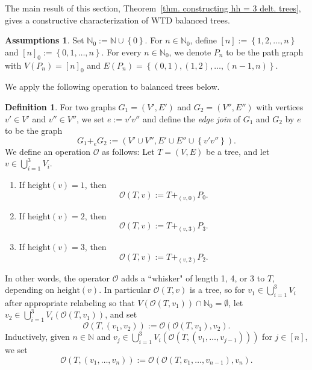 \documentclass[12pt, reqno]{amsart}
\theoremstyle{definition}
\newtheorem*{assumptions}{Assumptions}
\theoremstyle{plain}
\theoremstyle{definition}
\newtheorem{definition}[theorem]{Definition}
\newcommand{\hh}{\mbox{height}}
\newcommand\set[1]{\left\lbrace #1 \right\rbrace}
\begin{document}
The main result of this section, Theorem~\ref{thm. constructing hh = 3 delt. trees}, gives a constructive characterization of WTD balanced trees.

\begin{assumptions}
    Set $\mathbb{N}_0 := \mathbb{N} \cup \set{0}$. 
    For $n \in \mathbb{N}_0$, define $[n] := \set{1,2,\dots,n}$ and $[n]_0 := \set{0,1,\dots,n}$.
    For every $n \in \mathbb{N}_0$, we denote $P_n$ to be the path graph with $V(P_n) = [n]_0$ and $E(P_n) = \set{(0,1),(1,2),\dots,(n-1,n)}$.
\end{assumptions}

We apply the following operation to balanced trees below.

\begin{definition}
    For two graphs $G_1 = (V',E')$ and $G_2 = (V'',E'')$ with vertices $v' \in V'$ and $v'' \in V''$, we set $e:= v'v''$ and define the \emph{edge join} of $G_1$ and $G_2$ by $e$ to be the graph 
    $$
    G_1 +_e G_2 := (V'\cup V'', E' \cup E'' \cup \set{v'v''}).
    $$
    We define an operation $\mathcal{O}$ as follows:
    Let $T = (V,E)$ be a tree, and let $v \in \bigcup_{i = 1}^3V_i$.
    
    \begin{enumerate}
        \item If $\hh(v) = 1$, then 
        $$
        \mathcal{O}(T,v) := T +_{(v,0)} P_0.
        $$  
        \item  If $\hh(v) = 2$, then
        $$
        \mathcal{O}(T,v) := T +_{(v,3)} P_3.
        $$
        \item  If $\hh(v) = 3$, then
        $$
        \mathcal{O}(T,v) := T +_{(v,2)} P_2.
        $$
    \end{enumerate}
    In other words, the operator $\mathcal{O}$ adds a ``whisker" of length 1, 4, or 3 to $T$, depending on $\hh(v)$. 
    In particular $\mathcal{O}(T,v)$ is a tree, so for $v_1 \in \bigcup_{i = 1}^3V_i$ after appropriate relabeling so that $V(\mathcal{O}(T,v_1)) \cap \mathbb{N}_0 = \emptyset$, let $v_2 \in \bigcup_{i = 1}^3V_i(\mathcal{O}(T,v_1))$, and set
    $$
    \mathcal{O}(T,(v_1,v_2)) := \mathcal{O}(\mathcal{O}(T,v_1),v_2).
    $$
    Inductively, given $n \in \mathbb{N}$ and $v_j \in \bigcup_{i = 1}^3V_i\left(\mathcal{O}(T,(v_1,\dots,v_{j-1}))\right)$ for $j \in [n]$, we set
    $$
    \mathcal{O}(T,(v_1,\dots,v_n)) := \mathcal{O}(\mathcal{O}(T,v_1,\dots,v_{n-1}),v_n).
    $$
\end{definition}
\end{document}

